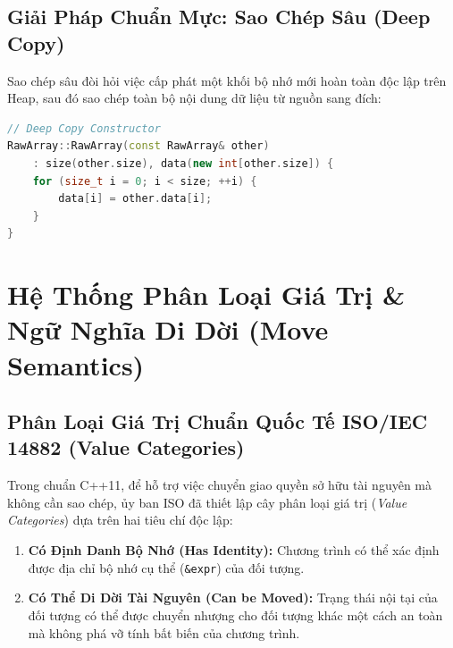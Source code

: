 \documentclass[12pt,a4paper,oneside]{book}
\begin{document}
\subsection{Giải Pháp Chuẩn Mực: Sao Chép Sâu (Deep Copy)}

Sao chép sâu đòi hỏi việc cấp phát một khối bộ nhớ mới hoàn toàn độc lập trên Heap, sau đó sao chép toàn bộ nội dung dữ liệu từ nguồn sang đích:
\begin{lstlisting}[language=C++]
// Deep Copy Constructor
RawArray::RawArray(const RawArray& other)
    : size(other.size), data(new int[other.size]) {
    for (size_t i = 0; i < size; ++i) {
        data[i] = other.data[i];
    }
}
\end{lstlisting}

\section{Hệ Thống Phân Loại Giá Trị \& Ngữ Nghĩa Di Dời (Move Semantics)}

\subsection{Phân Loại Giá Trị Chuẩn Quốc Tế ISO/IEC 14882 (Value Categories)}

Trong chuẩn C++11, để hỗ trợ việc chuyển giao quyền sở hữu tài nguyên mà không cần sao chép, ủy ban ISO đã thiết lập cây phân loại giá trị (\textit{Value Categories}) dựa trên hai tiêu chí độc lập:
\begin{enumerate}
    \item \textbf{Có Định Danh Bộ Nhớ (Has Identity):} Chương trình có thể xác định được địa chỉ bộ nhớ cụ thể (\texttt{\&expr}) của đối tượng.
    \item \textbf{Có Thể Di Dời Tài Nguyên (Can be Moved):} Trạng thái nội tại của đối tượng có thể được chuyển nhượng cho đối tượng khác một cách an toàn mà không phá vỡ tính bất biến của chương trình.
\end{enumerate}
\end{document}
